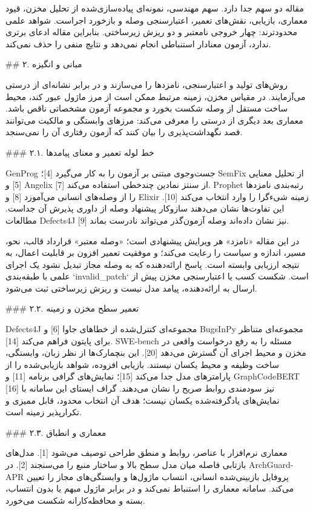 \documentclass[11pt,a4paper]{article}
\begin{document}
مقاله دو سهم جدا دارد. سهم مهندسی، نمونه‌ای پیاده‌سازی‌شده از تحلیل مخزن، قیود معماری، بازیابی، نقش‌های
تعمیر، اعتبارسنجی وصله و بازخورد اجراست. شواهد علمی محدودترند: چهار خروجی نامعتبر و دو ریزش زیرساختی.
بنابراین مقاله ادعای برتری ندارد، آزمون معنادار استنباطی انجام نمی‌دهد و نتایج منفی را حذف نمی‌کند.

\#\# ۲. مبانی و انگیزه

روش‌های تولید و اعتبارسنجی، نامزدها را می‌سازند و در برابر نشانه‌ای از درستی می‌آزمایند. در مقیاس
مخزن، زمینه مرتبط ممکن است از مرز ماژول عبور کند، محیط ساخت مستقل از وصله شکست بخورد و مجموعه آزمون
مشخصاتی ناقص باشد. معماری بعد دیگری از درستی را معرفی می‌کند: مرزهای وابستگی و مالکیت می‌توانند قصد
نگهداشت‌پذیری را بیان کنند که آزمون رفتاری آن را نمی‌سنجد.

\#\#\# ۲.۱. خط لوله تعمیر و معنای پیامدها

GenProg جست‌وجوی مبتنی بر آزمون را به کار می‌گیرد [4]؛ SemFix از تحلیل معنایی [5] و Angelix از سنتز
نمادین چندخطی استفاده می‌کند [7]. Prophet رتبه‌بندی نامزدها را از وصله‌های انسانی می‌آموزد [8] و
Elixir زمینه شیءگرا را وارد انتخاب می‌کند [10]. این تفاوت‌ها نشان می‌دهند سازوکار پیشنهاد وصله از
داوری پذیرش آن جداست. مطالعات Defects4J نیز نشان داده‌اند وصله آزمون‌گذر می‌تواند نادرست بماند [9].

در این مقاله «نامزد» هر ویرایش پیشنهادی است؛ «وصله معتبر» قرارداد قالب، نحو، مسیر، اندازه و سیاست را
رعایت می‌کند؛ و موفقیت تعمیر افزون بر قابلیت اعمال، به نتیجه ارزیابی وابسته است. پاسخ ارائه‌دهنده که
به وصله مجاز تبدیل نشود یک اجرای علمی با طبقه‌بندی `invalid_patch` است. شکست کسب یا اعتبارسنجی مخزن
پیش از ارسال به ارائه‌دهنده، پیامد مدل نیست و ریزش زیرساختی ثبت می‌شود.

\#\#\# ۲.۲. تعمیر سطح مخزن و زمینه

Defects4J مجموعه‌ای کنترل‌شده از خطاهای جاوا [6] و BugsInPy مجموعه‌ای متناظر برای پایتون فراهم می‌کند
[14]. SWE-bench مسئله را به رفع درخواست واقعی در مخزن و محیط اجرای آن گسترش می‌دهد [20]. این
بنچمارک‌ها از نظر زبان، وابستگی، ساخت وظیفه و محیط یکسان نیستند. بازیابی افزوده، شواهد بازیابی‌شده را
از پارامترهای مدل جدا می‌کند [15]؛ نمایش‌های گرافی برنامه [11] و GraphCodeBERT [16] نیز سودمندی
روابط صریح را نشان می‌دهند. گراف ایستای این سامانه با نمایش‌های یادگرفته‌شده یکسان نیست؛ هدف آن انتخاب
محدود، قابل ممیزی و تکرارپذیر زمینه است.

\#\#\# ۲.۳. معماری و انطباق

معماری نرم‌افزار با عناصر، روابط و منطق طراحی توصیف می‌شود [1]. مدل‌های بازتابی فاصله میان مدل سطح
بالا و ساختار منبع را می‌سنجند [2]. در ArchGuard-APR پروفایل بازبینی‌شده انسانی، انتساب ماژول‌ها و
وابستگی‌های مجاز را تعیین می‌کند. سامانه معماری را استنباط نمی‌کند و در برابر ماژول مبهم یا بدون
انتساب، بسته و محافظه‌کارانه شکست می‌خورد.
\end{document}

